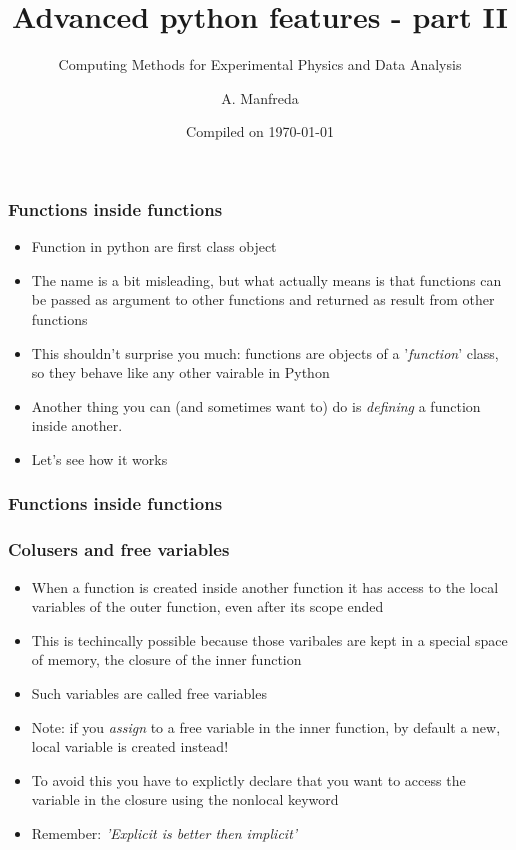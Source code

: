\documentclass[9pt]{beamer}
\title{Advanced python features - part II}
\subtitle{Computing Methods for Experimental Physics and Data Analysis}
\date{Compiled on \today}
\author{A. Manfreda}
\institute[INFN]{INFN--Pisa}
\begin{document}
\titleframe


\begin{frame}
  \frametitle{Functions inside functions}
  \begin{itemize}
    \item Function in python are \alert{first class object}
    \item The name is a bit misleading, but what actually means is that functions
          can be passed as argument to other functions and returned as result from
          other functions
    \item This shouldn't surprise you much: functions are objects of a
          '\emph{function}' class, so they behave like any other vairable in
          Python
    \item Another thing you can (and sometimes want to) do is \emph{defining} a
          function inside another.
    \item Let's see how it works
  \end{itemize}
  
\end{frame}


\begin{frame}
  \frametitle{Functions inside functions}
  
\end{frame}


\begin{frame}
  \frametitle{Colusers and free variables}
  \begin{itemize}
    \item When a function is created inside another function it has access to the local variables
          of the outer function, even after its scope ended
    \item This is techincally possible because those varibales are kept in a special
          space of memory, the \alert{closure} of the inner function
    \item Such variables are called \alert{free variables}
    \item Note: if you \emph{assign} to a free variable in the inner function, 
          by default a new, local variable is created instead!
    \item To avoid this you have to explictly declare that you want to access the variable in
          the closure using the \alert{nonlocal} keyword
    \item Remember: \emph{'Explicit is better then implicit'}
  \end{itemize}
  
\end{frame}
\end{document}
